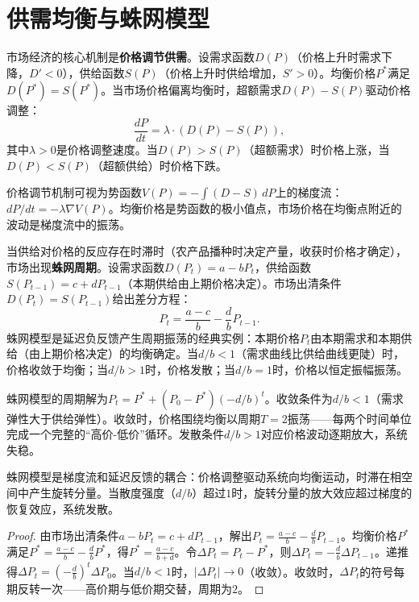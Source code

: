 \section{供需均衡与蛛网模型}

\begin{definition}[供需均衡]\label{def:supply_demand}
市场经济的核心机制是\textbf{价格调节供需}。设需求函数$D(P)$（价格上升时需求下降，$D' < 0$），供给函数$S(P)$（价格上升时供给增加，$S' > 0$）。均衡价格$P^*$满足$D(P^*) = S(P^*)$。当市场价格偏离均衡时，超额需求$D(P) - S(P)$驱动价格调整：
\[
\frac{dP}{dt} = \lambda \cdot (D(P) - S(P)),
\]
其中$\lambda > 0$是价格调整速度。当$D(P) > S(P)$（超额需求）时价格上涨，当$D(P) < S(P)$（超额供给）时价格下跌。

价格调节机制可视为势函数$V(P) = -\int (D - S)\,dP$上的梯度流：$dP/dt = -\lambda \nabla V(P)$。均衡价格是势函数的极小值点，市场价格在均衡点附近的波动是梯度流中的振荡。
\end{definition}

\begin{definition}[蛛网模型]\label{def:cobweb_model}
当供给对价格的反应存在时滞时（农产品播种时决定产量，收获时价格才确定），市场出现\textbf{蛛网周期}。设需求函数$D(P_t) = a - bP_t$，供给函数$S(P_{t-1}) = c + dP_{t-1}$（本期供给由上期价格决定）。市场出清条件$D(P_t) = S(P_{t-1})$给出差分方程：
\[
P_t = \frac{a-c}{b} - \frac{d}{b} P_{t-1}.
\]
蛛网模型是延迟负反馈产生周期振荡的经典实例：本期价格$P_t$由本期需求和本期供给（由上期价格决定）的均衡确定。当$d/b < 1$（需求曲线比供给曲线更陡）时，价格收敛于均衡；当$d/b > 1$时，价格发散；当$d/b = 1$时，价格以恒定振幅振荡。
\end{definition}

\begin{proposition}[蛛网周期的收敛条件]\label{prop:cobweb_convergence}
蛛网模型的周期解为$P_t = P^* + (P_0 - P^*)(-d/b)^t$。收敛条件为$d/b < 1$（需求弹性大于供给弹性）。收敛时，价格围绕均衡以周期$T = 2$振荡——每两个时间单位完成一个完整的“高价-低价”循环。发散条件$d/b > 1$对应价格波动逐期放大，系统失稳。

蛛网模型是梯度流和延迟反馈的耦合：价格调整驱动系统向均衡运动，时滞在相空间中产生旋转分量。当散度强度（$d/b$）超过$1$时，旋转分量的放大效应超过梯度的恢复效应，系统发散。
\end{proposition}

\begin{proof}
由市场出清条件$a - bP_t = c + dP_{t-1}$，解出$P_t = \frac{a-c}{b} - \frac{d}{b}P_{t-1}$。均衡价格$P^*$满足$P^* = \frac{a-c}{b} - \frac{d}{b}P^*$，得$P^* = \frac{a-c}{b+d}$。令$\Delta P_t = P_t - P^*$，则$\Delta P_t = -\frac{d}{b}\Delta P_{t-1}$。递推得$\Delta P_t = (-\frac{d}{b})^t \Delta P_0$。当$d/b < 1$时，$|\Delta P_t| \to 0$（收敛）。收敛时，$\Delta P_t$的符号每期反转一次——高价期与低价期交替，周期为$2$。
\end{proof}

